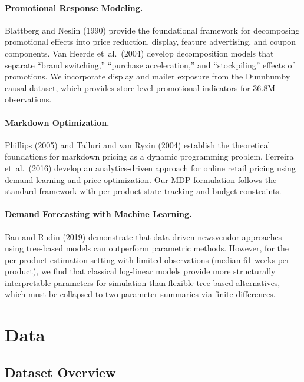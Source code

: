 \documentclass[12pt,a4paper]{article}
\begin{document}
\paragraph{Promotional Response Modeling.}
Blattberg and Neslin (1990) provide the foundational framework for
decomposing promotional effects into price reduction, display,
feature advertising, and coupon components. Van Heerde et~al.\ (2004)
develop decomposition models that separate ``brand switching,''
``purchase acceleration,'' and ``stockpiling'' effects of promotions.
We incorporate display and mailer exposure from the Dunnhumby causal
dataset, which provides store-level promotional indicators for 36.8M
observations.

\paragraph{Markdown Optimization.}
Phillips (2005) and Talluri and van Ryzin (2004) establish the
theoretical foundations for markdown pricing as a dynamic programming
problem. Ferreira et~al.\ (2016) develop an analytics-driven approach
for online retail pricing using demand learning and price optimization.
Our MDP formulation follows the standard framework with per-product
state tracking and budget constraints.

\paragraph{Demand Forecasting with Machine Learning.}
Ban and Rudin (2019) demonstrate that data-driven newsvendor
approaches using tree-based models can outperform parametric methods.
However, for the per-product estimation setting with limited
observations (median 61 weeks per product), we find that classical
log-linear models provide more structurally interpretable parameters
for simulation than flexible tree-based alternatives, which must be
collapsed to two-parameter summaries via finite differences.

\section{Data}
\label{sec:data}

\subsection{Dataset Overview}
\end{document}
